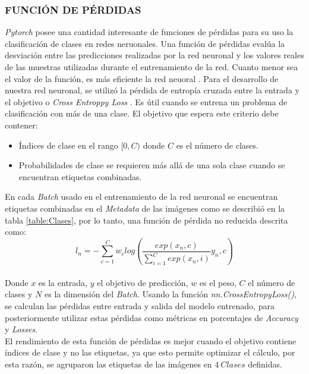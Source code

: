 			\subsubsection{FUNCIÓN DE PÉRDIDAS}		
			
			\textit{Pytorch} posee una cantidad interesante de funciones de pérdidas para su uso la clasificación de clases en redes neruonales. Una función de pérdidas evalúa la desviación entre las predicciones realizadas por la red neuronal y los valores reales de las muestras utilizadas durante el entrenamiento de la red. Cuanto menor sea el valor de la función, es más eficiente la red neuoral \cite{mathivet2018inteligencia}. 	
			Para el desarrollo de nuestra red neuronal, se utilizó la pérdida de entropía cruzada entre la entrada y el objetivo o \textit{Cross Entroppy Loss} \cite{Pytorch}. Es útil cuando se entrena un problema de clasificación con más de una clase.  El objetivo que espera este criterio debe contener:
			
			\begin{itemize}
				\item Índices de clase en el rango $[0,C)$ donde $C$ es el número de clases.
				\item Probabilidades de clase se requieren más allá de una sola clase cuando se encuentran etiquetas combinadas.				 
			\end{itemize}
			
			En cada \textit{Batch} usado en el entrenamiento de la red neuronal se encuentran etiquetas combinadas en el \textit{Metadata} de las imágenes como se describió en la tabla \ref{table:Clases}, por lo tanto, una función de pérdida no reducida \cite{Pytorch} descrita como:\\
			
			\begin{equation}
				{l_n=-\sum_{c=1}^{C}w_c log\left(\frac{exp(x_n,c)}{\sum_{i=1}^{C}exp(x_n,i)}y_n,c\right)}
			\end{equation}\\
			
			Donde $x$ es la entrada, $y$ el objetivo de predicción, $w$ es el peso, $C$ el número de clases y $N$ es la dimensión del \textit{Batch}. Usando la función \textit{nn.CrossEntropyLoss()}, se calculan las pérdidas entre entrada y salida del modelo entrenado, para posteriormente utilizar estas pérdidas como métricas en porcentajes de \textit{Accuracy} y \textit{Losses}.\\
			
			
			El rendimiento de esta función de pérdidas es mejor cuando el objetivo contiene índices de clase y no las etiquetas, ya que esto permite optimizar el cálculo, por esta razón, se agruparon las etiquetas de las imágenes en $4 \ Clases$ definidas.
			
